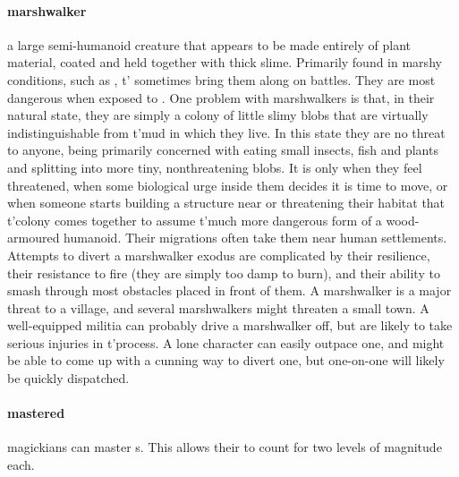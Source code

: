 \paragraph{marshwalker} a large semi-humanoid creature that appears to be made entirely of plant material, coated and held together with thick slime. Primarily found in marshy conditions, such as , t'\allowbreak {} sometimes bring them along on battles. They are most dangerous when exposed to . One problem with marshwalkers is that, in their natural state, they are simply a colony of little slimy blobs that are virtually indistinguishable from t'\allowbreak mud in which they live. In this state they are no threat to anyone, being primarily concerned with eating small insects, fish and plants and splitting into more tiny, nonthreatening blobs. It is only when they feel threatened, when some biological urge inside them decides it is time to move, or when someone starts building a structure near or threatening their habitat that t'\allowbreak colony comes together to assume t'\allowbreak much more dangerous form of a wood-armoured humanoid. Their migrations often take them near human settlements. Attempts to divert a marshwalker exodus are complicated by their resilience, their resistance to fire (they are simply too damp to burn), and their ability to smash through most obstacles placed in front of them. A marshwalker is a major threat to a village, and several marshwalkers might threaten a small town. A well-equipped militia can probably drive a marshwalker off, but are likely to take serious injuries in t'\allowbreak process. A lone character can easily outpace one, and might be able to come up with a cunning way to divert one, but one-on-one will likely be quickly dispatched. 
\paragraph{mastered} magickians can master s. This allows their  to count for two levels of magnitude each.
